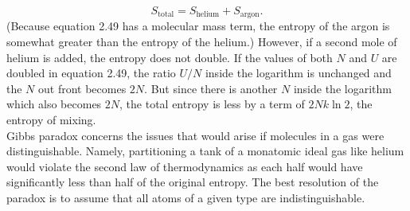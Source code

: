 \documentclass[11pt]{exam}
\begin{document}
\begin{equation}\tag{2.56}
S_\text{total}=S_\text{helium} + S_\text{argon}.    
\end{equation}
(Because equation 2.49 has a molecular mass term, the entropy of the argon is somewhat greater than the entropy of the helium.) However, if a second mole of helium is added, the entropy does not double. If the values of both $N$ and $U$ are doubled in equation 2.49, the ratio $U/N$ inside the logarithm is unchanged and the $N$ out front becomes $2N$. But since there is another $N$ inside the logarithm which also becomes $2N$, the total entropy is less by a term of $2Nk\ln{2}$, the entropy of mixing.\\
\hspace*{10mm}Gibbs paradox concerns the issues that would arise if molecules in a gas were distinguishable. Namely, partitioning a tank of a monatomic ideal gas like helium would violate the second law of thermodynamics as each half would have significantly less than half of the original entropy. The best resolution of the paradox is to assume that all atoms of a given type are indistinguishable. 
\newpage
\end{document}
